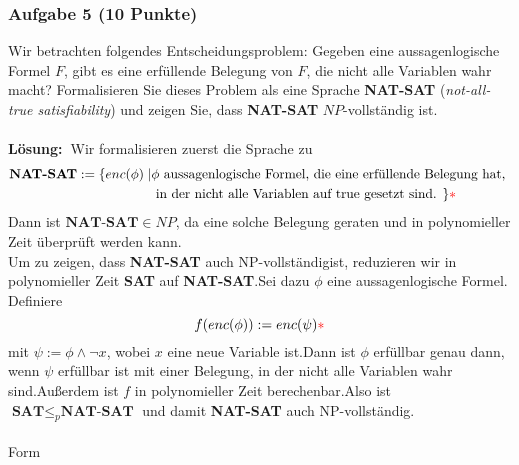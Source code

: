\documentclass[a4paper,10pt]{article}
\newcommand{\f}[1]{\textbf{#1}}
\newcommand{\LOES}{\f{Lösung:~}}
\newcommand{\prob}[1]{\textbf{#1}}
\begin{document}
\subsubsection*{Aufgabe 5 (10 Punkte)}
Wir betrachten folgendes Entscheidungsproblem: Gegeben eine aussagenlogische Formel $F$, gibt es eine erfüllende Belegung von $F$, die nicht alle Variablen wahr macht? Formalisieren Sie dieses Problem als eine Sprache \prob{NAT-SAT} (\textit{not-all-true satisfiability}) und zeigen Sie, dass \prob{NAT-SAT} $NP$-vollständig ist. \\\\
\LOES Wir formalisieren zuerst die Sprache zu 
\begin{align*}
\prob{NAT-SAT} := \{enc(\phi) \mid & \phi \text{ aussagenlogische Formel, die eine erfüllende Belegung hat, } \\
& \text{ in der nicht alle Variablen auf true gesetzt sind. } \}\POINT
\end{align*}
Dann ist $\prob{NAT-SAT} \in NP$\POINT, da eine solche Belegung geraten und in polynomieller Zeit überprüft werden kann.\POINT \\
Um zu zeigen, dass \prob{NAT-SAT} auch NP-vollständig\POINT ist, reduzieren wir in polynomieller Zeit \prob{SAT} auf \prob{NAT-SAT}.\POINT Sei dazu $\phi$ eine aussagenlogische Formel. Definiere
\begin{equation*}
f(enc(\phi)) := enc(\psi){\textcolor{red}{* }}
\end{equation*}
 mit $\psi := \phi \land \neg x$, wobei $x$ eine neue Variable ist.\POINT Dann ist $\phi$ erfüllbar genau dann, wenn $\psi$ erfüllbar ist mit einer Belegung, in der nicht alle Variablen wahr sind.\POINT Außerdem ist $f$ in polynomieller Zeit berechenbar.\POINT Also ist $\prob{SAT} \leq_p \prob{NAT-SAT}$ und damit \prob{NAT-SAT} auch NP-vollständig.\\\\
Form\POINT 
\end{document}
